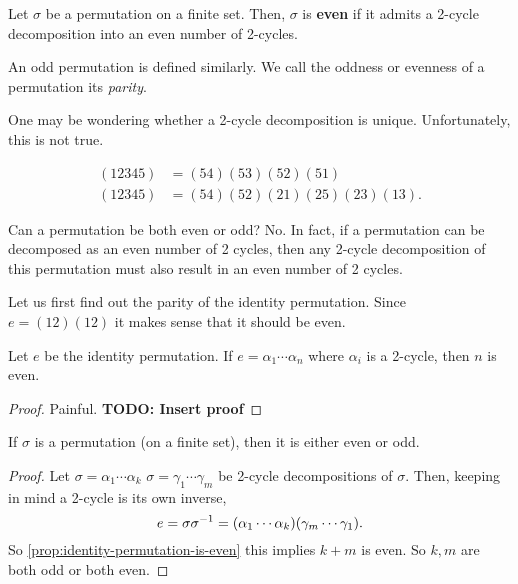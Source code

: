 \documentclass[./main.tex]{subfiles}
\begin{document}
\begin{definition}
    \label{def:even-odd-permutation}
    Let $\sigma$ be a permutation on a finite set. Then, $\sigma$ is
    \textbf{even} if it admits a 2-cycle decomposition into an even number of
    2-cycles. 
\end{definition}
An odd permutation is defined similarly. We call the oddness or evenness of a
permutation its \emph{parity}.

One may be wondering whether a 2-cycle decomposition is unique. Unfortunately,
this is not true.  

\begin{example}
    \begin{align*}
        (12345) &= (54)(53)(52)(51) \\
        (12345) &= (54)(52)(21)(25)(23)(13).
    \end{align*}
\end{example}

Can a permutation be both even or odd? No. In fact, if a permutation can be
decomposed as an even number of 2 cycles, then any 2-cycle decomposition of this
permutation must also result in an even number of 2 cycles. 

Let us first find out the parity of the identity permutation. Since $e =
(12)(12)$ it makes sense that it should be even. 
\begin{proposition}
\label{prop:identity-permutation-is-even}
    Let $e$ be the identity permutation. If $e = \alpha_1 \cdots \alpha_n$ where
    $\alpha_i$ is a 2-cycle, then $n$ is even.
\end{proposition}
\begin{proof}
    Painful. \textbf{TODO: Insert proof}
\end{proof}

\begin{theorem}
    If $\sigma$ is a permutation (on a finite set), then it is either even or odd.
\end{theorem}
\begin{proof}
    Let $\sigma = \alpha_1 \cdots \alpha_k$ $\sigma = \gamma_1 \cdots \gamma_m$
    be 2-cycle decompositions of $\sigma$. Then, keeping in mind a 2-cycle is
    its own inverse,
    \[
        e = \sigma \sigma\inv = \paren{\alpha_1 \cdots \alpha_k} \paren{\gamma_m \cdots \gamma_1}.
    \]
    So \cref{prop:identity-permutation-is-even} this implies $k+m$ is even. So
    $k,m$ are both odd or both even.
\end{proof}
\end{document}
